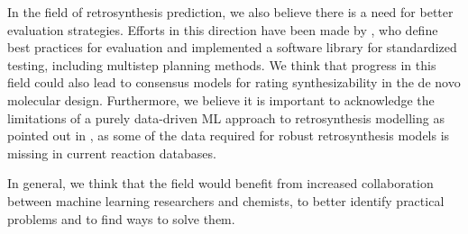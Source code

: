 In the field of retrosynthesis prediction, we also believe there is a need for better evaluation
strategies. Efforts in this direction have been made by
\citet{maziarzReevaluatingRetrosynthesisAlgorithms2024}, who define best practices for evaluation
and implemented a software library for standardized testing, including multistep planning methods.
We think that progress in this field could also lead to consensus models for rating synthesizability
in the de novo molecular design. Furthermore, we believe it is important to acknowledge the
limitations of a purely data-driven ML approach to retrosynthesis modelling as pointed out in
\citet{strieth-kalthoffArtificialIntelligenceRetrosynthetic2024}, as some of the data required for
robust retrosynthesis models is missing in current reaction databases.

In general, we think that the field would benefit from increased collaboration between machine
learning researchers and chemists, to better identify practical problems
\citep{benderArtificialIntelligenceDrug2021} and to find ways to solve them.


